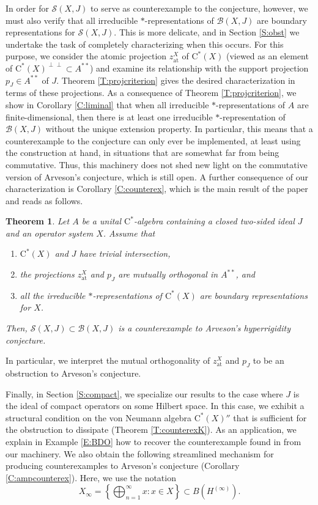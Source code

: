\documentclass[10pt]{amsart}
\newcommand{\B}{{\mathcal{B}}}
\renewcommand{\S}{{\mathcal{S}}}
\newcommand{\rC}{\mathrm{C}}
\newcommand{\at}{\operatorname{at}}
\newtheorem{theoremx}{Theorem}
\theoremstyle{definition}
\begin{document}
In order for $\S(X,J)$ to serve as counterexample to the conjecture, however, we must also verify that all irreducible $*$-representations of $\B(X,J)$ are boundary representations for $\S(X,J)$. This is more delicate, and in Section \ref{S:obst} we undertake the task of completely characterizing when this occurs. For this purpose, we consider the atomic projection $z^X_{\at}$ of $\rC^*(X)$ (viewed as an element of $\rC^*(X)^{\perp\perp}\subset A^{**}$) and examine its relationship with the support projection $p_J\in A^{**}$ of $J$. Theorem \ref{T:projcriterion} gives the desired characterization in terms of these projections. As a consequence of Theorem \ref{T:projcriterion}, we show in Corollary \ref{C:liminal} that when all irreducible $*$-representations of $A$ are finite-dimensional, then there is at least one irreducible $*$-representation of $\B(X,J)$ without the unique extension property.  In particular, this means that a counterexample to the conjecture can only ever be implemented, at least using the construction at hand, in situations that are somewhat far from being commutative. Thus, this machinery does not shed new light on the commutative version of Arveson's conjecture, which is still open.   A further consequence of our characterization is Corollary \ref{C:counterex}, which is the main result of the paper and reads as follows.

\begin{theoremx}\label{T:A}
Let $A$ be a unital $\rC^*$-algebra containing a closed two-sided ideal $J$ and an operator system $X$.  Assume that 
\begin{enumerate}[{\rm (i)}]
\item $\rC^*(X)$ and $J$ have trivial intersection,
\item the projections $z^X_{\at}$ and $p_J$ are mutually orthogonal in $A^{**}$, and
\item all the irreducible $*$-representations of $\rC^*(X)$ are boundary representations for $X$.
\end{enumerate}
Then, $\S(X,J)\subset \B(X,J)$ is a counterexample to Arveson's hyperrigidity conjecture.
\end{theoremx}

In particular, we interpret the mutual orthogonality of $z^X_{\at}$ and $p_J$ to be an obstruction to Arveson's conjecture. 



Finally, in Section \ref{S:compact}, we specialize our results to the case where $J$ is the ideal of compact operators on some Hilbert space. In this case, we exhibit a structural condition on the von Neumann algebra $\rC^*(X)''$ that is sufficient for the obstruction to dissipate (Theorem \ref{T:counterexK}). As an application, we explain in Example \ref{E:BDO} how to recover the counterexample found in \cite{BDO2024} from our machinery. We also obtain the following streamlined mechanism for producing counterexamples to Arveson's conjecture (Corollary \ref{C:ampcounterex}). Here, we use the notation
\[
X_\infty=\left\{\bigoplus_{n=1}^\infty x:x\in X\right\}\subset B(H^{(\infty)}).
\]
\end{document}
